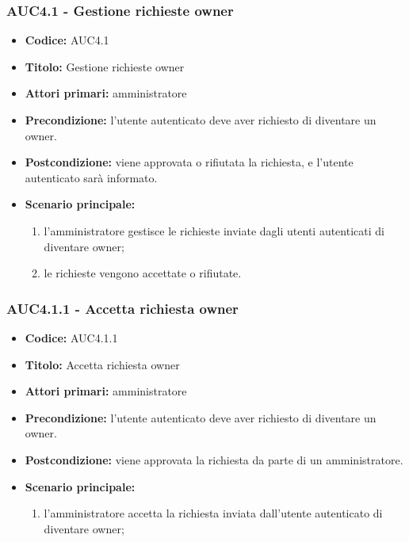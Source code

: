\documentclass[casi-duso]{subfiles}
\begin{document}
\subsubsection{AUC4.1 - Gestione richieste owner}%
\label{subsub:AUC4.1}
\begin{itemize}
  \item \textbf{Codice:} AUC4.1
  \item \textbf{Titolo:} Gestione richieste owner
  \item \textbf{Attori primari:} amministratore
  \item \textbf{Precondizione:} l'utente autenticato deve aver richiesto di diventare un owner.
  \item \textbf{Postcondizione:} viene approvata o rifiutata la richiesta, e l'utente autenticato sarà informato.
  \item \textbf{Scenario principale:} 
  \begin{enumerate}
    \item l'amministratore gestisce le richieste inviate dagli utenti autenticati di diventare owner;
    \item le richieste vengono accettate o rifiutate.
  \end{enumerate}
\end{itemize}

\subsubsection{AUC4.1.1 - Accetta richiesta owner}%
\label{subsub:AUC4.1.1}
\begin{itemize}
  \item \textbf{Codice:} AUC4.1.1
  \item \textbf{Titolo:} Accetta richiesta owner
  \item \textbf{Attori primari:} amministratore
  \item \textbf{Precondizione:} l'utente autenticato deve aver richiesto di diventare un owner.
  \item \textbf{Postcondizione:} viene approvata la richiesta da parte di un amministratore.
  \item \textbf{Scenario principale:}
  \begin{enumerate}
    \item l'amministratore accetta la richiesta inviata dall'utente autenticato di diventare owner;
  \end{enumerate}
\end{itemize}
\end{document}
